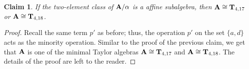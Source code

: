 \documentclass[11pt]{amsart}
\newcommand{\m}[1]{\mathbf{\uppercase{#1}}}
\theoremstyle{definition}
\theoremstyle{remark}
\theoremstyle{plain}
\newtheorem{claim}[thm]{Claim}
\begin{document}
\begin{claim}
If the two-element class of $\m a/\alpha$ is a affine subalgebra, then  $\m a\cong\m t_{4,17}$ or $\m a\cong\m t_{4,18}$.
\end{claim}

\begin{proof}
Recall the same term $p'$ as before; thus, the operation $p'$ on the set $\{a,d\}$ acts as the minority operation. Similar to the proof of the previous claim, we get that $\m a$ is one of the minimal Taylor algebras $\m a\cong\m t_{4,17}$ and $\m a\cong\m t_{4,18}$. The details of the proof are left to the reader.
\end{proof}


\end{document}
